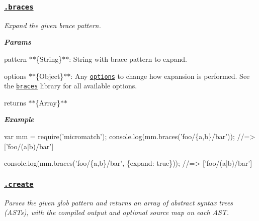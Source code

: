 {\itshape 
{}
}

{\itshape \subsubsection*{\href{index.js#L618}{\tt .braces}}}

{\itshape }

{\itshape Expand the given brace {\ttfamily pattern}.}

{\itshape {\bfseries Params}}

{\itshape 
\begin{DoxyItemize}
\item {\ttfamily pattern} $\ast$$\ast$\{String\}$\ast$$\ast$\+: String with brace pattern to expand.
\item {\ttfamily options} $\ast$$\ast$\{Object\}$\ast$$\ast$\+: Any \href{#options}{\tt options} to change how expansion is performed. See the \href{https://github.com/micromatch/braces}{\tt braces} library for all available options.
\item {\ttfamily returns} $\ast$$\ast$\{Array\}$\ast$$\ast$
\end{DoxyItemize}}

{\itshape {\bfseries Example}}

{\itshape 
\begin{DoxyCode}
var mm = require('micromatch');
console.log(mm.braces('foo/\{a,b\}/bar'));
//=> ['foo/(a|b)/bar']

console.log(mm.braces('foo/\{a,b\}/bar', \{expand: true\}));
//=> ['foo/(a|b)/bar']
\end{DoxyCode}
}

{\itshape \subsubsection*{\href{index.js#L685}{\tt .create}}}

{\itshape }

{\itshape Parses the given glob {\ttfamily pattern} and returns an array of abstract syntax trees (A\+S\+Ts), with the compiled {\ttfamily output} and optional source {\ttfamily map} on each A\+ST.}

